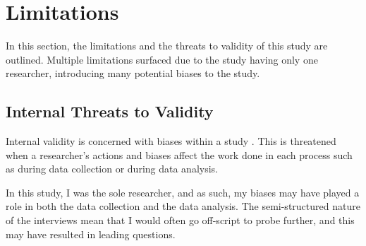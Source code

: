 


\section{Limitations}
In this section, the limitations and the threats to validity of this study are outlined. Multiple limitations surfaced due to the study having only one researcher, introducing many potential biases to the study.

\subsection{Internal Threats to Validity}
Internal validity is concerned with biases within a study \cite{creswell2013research}. This is threatened when a researcher's actions and biases affect the work done in each process such as during data collection or during data analysis.

In this study, I was the sole researcher, and as such, my biases may have played a role in both the data collection and the data analysis. The semi-structured nature of the interviews mean that I would often go off-script to probe further, and this may have resulted in leading questions.

